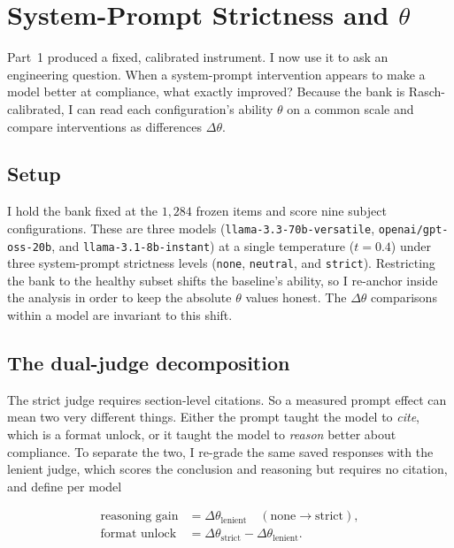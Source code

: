 \section{System-Prompt Strictness and \texorpdfstring{$\theta$}{Theta}}
\label{sec:deltatheta}

Part~1 produced a fixed, calibrated instrument. I now use it to ask an
engineering question. When a system-prompt intervention appears to make a
model better at compliance, what exactly improved? Because the bank is
Rasch-calibrated, I can read each configuration's ability $\theta$ on a
common scale and compare interventions as differences $\Delta\theta$.

\subsection{Setup}
I hold the bank fixed at the $1{,}284$ frozen items and score nine
subject configurations. These are three models
(\texttt{llama-3.3-70b-versatile}, \texttt{openai/gpt-oss-20b}, and
\texttt{llama-3.1-8b-instant}) at a single temperature ($t = 0.4$) under
three system-prompt strictness levels (\texttt{none}, \texttt{neutral},
and \texttt{strict}). Restricting the bank to the healthy subset shifts
the baseline's ability, so I re-anchor inside the analysis in order to
keep the absolute $\theta$ values honest. The $\Delta\theta$ comparisons
within a model are invariant to this shift.

\subsection{The dual-judge decomposition}
The strict judge requires section-level citations. So a measured prompt
effect can mean two very different things. Either the prompt taught the
model to \emph{cite}, which is a format unlock, or it taught the model to
\emph{reason} better about compliance. To separate the two, I re-grade
the same saved responses with the lenient judge, which scores the
conclusion and reasoning but requires no citation, and define per model

\begin{align}
\text{reasoning gain} &= \Delta\theta_{\text{lenient}}
  \quad(\text{none}\!\to\!\text{strict}),\\
\text{format unlock}  &= \Delta\theta_{\text{strict}}
  - \Delta\theta_{\text{lenient}}.
\end{align}

